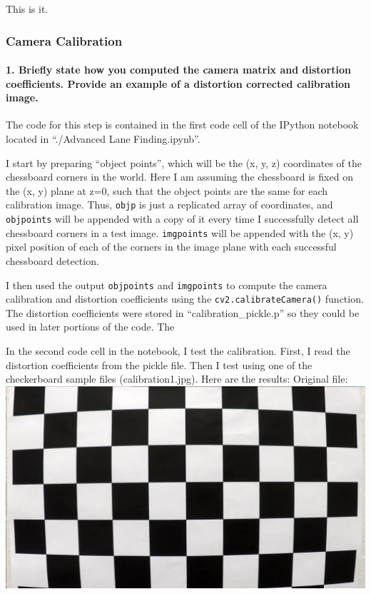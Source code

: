 \documentclass[11pt]{article}
\makeatletter
\def\maxwidth{\ifdim\Gin@nat@width>\linewidth\linewidth
    \else\Gin@nat@width\fi}
\let\Oldincludegraphics\includegraphics
\renewcommand{\includegraphics}[1]{\Oldincludegraphics[width=.8\maxwidth]{#1}}
\makeatother
\begin{document}
This is it.

\hypertarget{camera-calibration}{%
\subsubsection{Camera Calibration}\label{camera-calibration}}

\hypertarget{briefly-state-how-you-computed-the-camera-matrix-and-distortion-coefficients.-provide-an-example-of-a-distortion-corrected-calibration-image.}{%
\paragraph{1. Briefly state how you computed the camera matrix and
distortion coefficients. Provide an example of a distortion corrected
calibration
image.}\label{briefly-state-how-you-computed-the-camera-matrix-and-distortion-coefficients.-provide-an-example-of-a-distortion-corrected-calibration-image.}}

The code for this step is contained in the first code cell of the
IPython notebook located in ``./Advanced Lane Finding.ipynb''.

I start by preparing ``object points'', which will be the (x, y, z)
coordinates of the chessboard corners in the world. Here I am assuming
the chessboard is fixed on the (x, y) plane at z=0, such that the object
points are the same for each calibration image. Thus, \texttt{objp} is
just a replicated array of coordinates, and \texttt{objpoints} will be
appended with a copy of it every time I successfully detect all
chessboard corners in a test image. \texttt{imgpoints} will be appended
with the (x, y) pixel position of each of the corners in the image plane
with each successful chessboard detection.

I then used the output \texttt{objpoints} and \texttt{imgpoints} to
compute the camera calibration and distortion coefficients using the
\texttt{cv2.calibrateCamera()} function. The distortion coefficients
were stored in ``calibration\_pickle.p'' so they could be used in later
portions of the code. The

In the second code cell in the notebook, I test the calibration. First,
I read the distortion coefficients from the pickle file. Then I test
using one of the checkerboard sample files (calibration1.jpg). Here are
the results: Original file:
\includegraphics{./camera_cal/calibration1.jpg}
\end{document}
